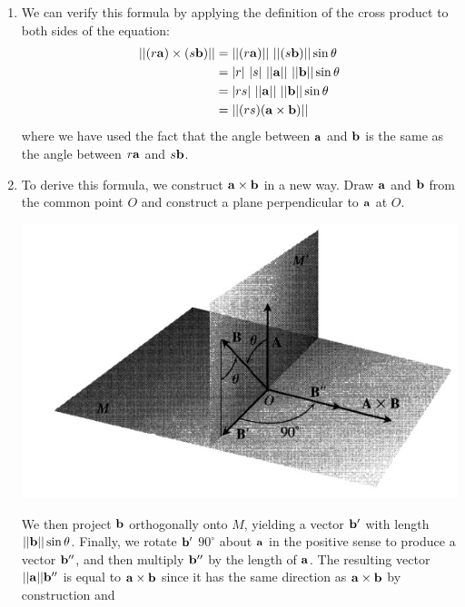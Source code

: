 \documentclass[12pt,letterpaper,reqno]{article}
\numberwithin{equation}{section}
\begin{document}
\begin{pf}
\begin{enumerate}[(1)]\hspace{10cm}
	\item We can verify this formula by applying the definition of the cross product to both sides of the equation:
	\begin{align*}
		||(r{\bf a}) \times (s{\bf b})||&=||(r{\bf a}) || \ ||(s{\bf b})||\sin \theta  \\&=|r| \ |s | \ ||{\bf a} || \ ||{\bf b} || \sin \theta \\
		&=|rs| \ ||{\bf a} || \ ||{\bf b} || \sin \theta \\
		&=||(rs)({\bf a}\times {\bf b})||
	\end{align*}
where we have used the fact that the angle between ${\bf a}$ and ${\bf b}$ is the same as the angle between $r{\bf a}$ and $s{\bf b}$.
	\item To derive this formula, we construct ${\bf a} \times {\bf b}$ in a new way. Draw ${\bf a}$ and ${\bf b}$ from the common point $O$ and construct a plane perpendicular to ${\bf a}$ at $O$.
\begin{center}
	\includegraphics[scale=0.5]{figures_mvc/distributivity_of_the_cross_product_1}
\end{center}
We then project ${\bf b}$ orthogonally onto $M$, yielding a vector ${\bf b}'$ with length $||{\bf b}||\sin \theta$. Finally, we rotate ${\bf b}'$ $90^\circ$ about ${\bf a}$ in the positive sense to produce a vector ${\bf b}''$, and then multiply ${\bf b}''$ by the length of ${\bf a}$. The resulting vector $||{\bf a}||{\bf b}''$ is equal to ${\bf a} \times {\bf b}$ since it has the same direction as ${\bf a} \times {\bf b}$ by construction and 
\begin{align*}

\end{align*}
\end{enumerate}
\end{pf}
\end{document}
